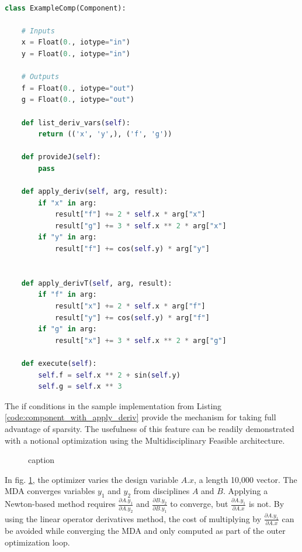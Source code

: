 \documentclass[]{aiaa-tc} %
\begin{document}
\begin{minipage}{\linewidth}
\begin{lstlisting}[label=code:component_with_apply_deriv,caption=Example OpenMDAO
component with apply\_deriv and apply\_derivT methods implemented,
language=Python , basicstyle=\ttfamily\scriptsize,
           keywordstyle=\color{blue}\ttfamily,
           stringstyle=\color{red}\ttfamily, showstringspaces=false,
           commentstyle=\color{olive}\ttfamily]

class ExampleComp(Component):

    # Inputs
    x = Float(0., iotype="in")
    y = Float(0., iotype="in")

    # Outputs
    f = Float(0., iotype="out")
    g = Float(0., iotype="out")

    def list_deriv_vars(self):
        return (('x', 'y',), ('f', 'g'))

    def provideJ(self):
        pass

    def apply_deriv(self, arg, result):
        if "x" in arg:
            result["f"] += 2 * self.x * arg["x"]
            result["g"] += 3 * self.x ** 2 * arg["x"]
        if "y" in arg:
            result["f"] += cos(self.y) * arg["y"]


    def apply_derivT(self, arg, result):
        if "f" in arg:
            result["x"] += 2 * self.x * arg["f"]
            result["y"] += cos(self.y) * arg["f"]
        if "g" in arg:
            result["x"] += 3 * self.x ** 2 * arg["g"]

    def execute(self):
        self.f = self.x ** 2 + sin(self.y)
        self.g = self.x ** 3

\end{lstlisting}
\end{minipage}

    The if conditions in the sample implementation from Listing \ref{code:component_with_apply_deriv} provide the
    mechanism for taking full advantage of sparsity. The usefulness of this feature can be readily demonstrated with
    a notional optimization using the Multidisciplinary Feasible architecture\cite{martins:arch:survey}.

    \begin{figure}[htbp]
        \caption{caption}
        \label{fig:MDF:XDSM}
    \end{figure}

    In fig. \ref{fig:MDF:XDSM}, the optimizer varies the design variable $A.x$, a length 10,000 vector.
    The MDA converges variables $y_1$ and $y_2$ from disciplines $A$ and $B$. Applying a
    Newton-based method requires $\frac{\partial A.y_1}{\partial A.y_2}$ and $\frac{\partial B.y_2}{\partial B.y_1}$
    to converge, but $\frac{\partial A.y_1}{\partial A.x}$ is not. By using the linear operator derivatives method,
    the cost of multiplying by $\frac{\partial A.y_1}{\partial A.x}$ can be avoided while converging the MDA and only
    computed as part of the outer optimization loop.
\end{document}

